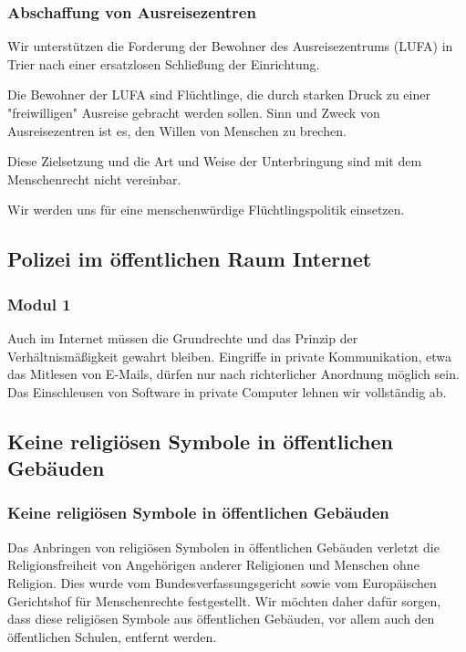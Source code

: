 \subsubsection{Abschaffung von Ausreisezentren}
\abstimmung
Wir unterstützen die Forderung der Bewohner des Ausreisezentrums (LUFA) in Trier nach einer ersatzlosen Schließung der Einrichtung.

Die Bewohner der LUFA sind Flüchtlinge, die durch starken Druck zu einer "freiwilligen" Ausreise gebracht werden sollen. Sinn und Zweck von Ausreisezentren ist es, den Willen von Menschen zu brechen.

Diese Zielsetzung und die Art und Weise der Unterbringung sind mit dem Menschenrecht nicht vereinbar.

Wir werden uns für eine menschenwürdige Flüchtlingspolitik einsetzen.
 
\subsection*{Polizei im öffentlichen Raum Internet}
\subsubsection{Modul 1}
\abstimmung
Auch im Internet müssen die Grundrechte und das Prinzip der Verhältnismäßigkeit gewahrt bleiben. Eingriffe in private Kommunikation, etwa das Mitlesen von E-Mails, dürfen nur nach richterlicher Anordnung möglich sein. Das Einschleusen von Software in private Computer lehnen wir vollständig ab.
 
\subsection*{Keine religiösen Symbole in öffentlichen Gebäuden}
\label{justiz:symbole1}
\subsubsection{Keine religiösen Symbole in öffentlichen Gebäuden}
\abstimmung
Das Anbringen von religiösen Symbolen in öffentlichen Gebäuden verletzt die Religionsfreiheit von Angehörigen anderer Religionen und Menschen ohne Religion. Dies wurde vom Bundesverfassungsgericht sowie vom Europäischen Gerichtshof für Menschenrechte festgestellt. Wir möchten daher dafür sorgen, dass diese religiösen Symbole aus öffentlichen Gebäuden, vor allem auch den öffentlichen Schulen, entfernt werden.
 
